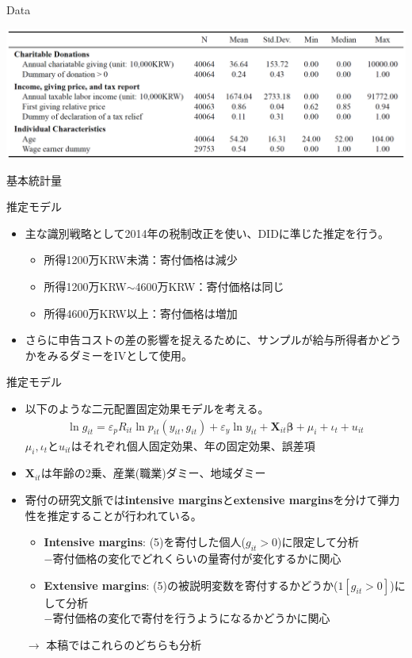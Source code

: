 \documentclass[dvipdfmx,10pt]{beamer}
\begin{document}
\begin{frame}{Data}
	\begin{table}
		\centering
		\includegraphics[width=0.9\linewidth]{Tab_Stat}
		\caption{基本統計量}
		\label{tab:1}
	\end{table}
\end{frame}

\begin{frame}{推定モデル}
\begin{itemize}
	\item 主な識別戦略として2014年の税制改正を使い、DIDに準じた推定を行う。
	\begin{itemize}
		\item 所得1200万KRW未満：寄付価格は減少
		\item 所得1200万KRW$\sim$4600万KRW：寄付価格は同じ
		\item 所得4600万KRW以上：寄付価格は増加
	\end{itemize}
	\item さらに申告コストの差の影響を捉えるために、サンプルが給与所得者かどうかをみるダミーをIVとして使用。
\end{itemize}
\end{frame}

\begin{frame}{推定モデル}
	\begin{itemize}
		\item 以下のような二元配置固定効果モデルを考える。
		\begin{align}
			\ln g_{it} = \varepsilon_pR_{it} \ln p_{it}(y_{it}, g_{it}) + \varepsilon_y \ln y_{it} + \bm{X}_{it}\bm{\beta} + \mu_i + \iota_t + u_{it}\tag{5}
		\end{align}
	$\mu_i, \iota_t$と$ u_{it}$はそれぞれ個人固定効果、年の固定効果、誤差項 
	\item $\bm{X}_{it}$は年齢の2乗、産業(職業)ダミー、地域ダミー
	\item 寄付の研究文脈では\textbf{intensive margins}と\textbf{extensive margins}を分けて弾力性を推定することが行われている。
	\begin{itemize}
		\item \textbf{Intensive margins}: (5)を寄付した個人($g_{it}>0$)に限定して分析\\
		$-$寄付価格の変化でどれくらいの量寄付が変化するかに関心
		\item \textbf{Extensive margins}: (5)の被説明変数を寄付するかどうか($1[g_{it}>0]$)にして分析\\
		$-$寄付価格の変化で寄付を行うようになるかどうかに関心
	\end{itemize}
	$\to$ 本稿ではこれらのどちらも分析
	\end{itemize}
\end{frame}
\end{document}

